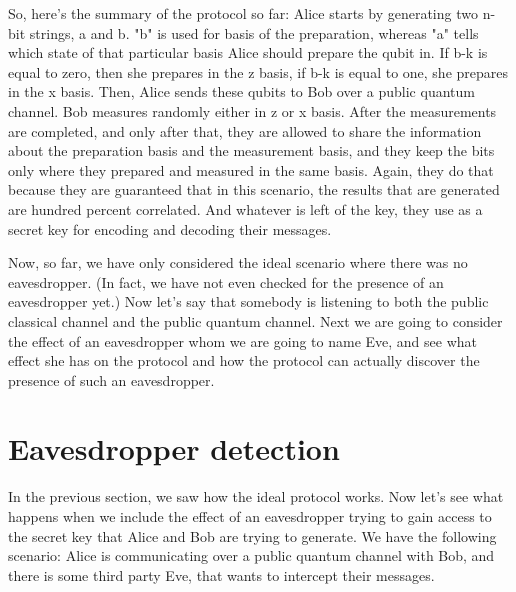 So, here's the summary of the protocol so far: Alice starts by generating two n-bit strings, a and b. "b" is used for basis of the preparation, whereas "a" tells which state of that particular basis Alice should prepare the qubit in. If b-k is equal to zero, then she prepares in the z basis, if b-k is equal to one, she prepares in the x basis. Then, Alice sends these qubits to Bob over a public quantum channel. Bob measures randomly either in z or x basis. After the measurements are completed, and only after that, they are allowed to share the information about the preparation basis and the measurement basis, and they keep the bits only where they prepared and measured in the same basis. Again, they do that because they are guaranteed that in this scenario, the results that are generated are hundred percent correlated. And whatever is left of the key, they use as a secret key for encoding and decoding their messages.

Now, so far, we have only considered the ideal scenario where there was no eavesdropper.  (In fact, we have not even checked for the presence of an eavesdropper yet.) Now let's say that somebody is listening to both the public classical channel and the public quantum channel. Next we are going to consider the effect of an eavesdropper whom we are going to name Eve, and see what effect she has on the protocol and how the protocol can actually discover the presence of such an eavesdropper.

\section{Eavesdropper detection}

In the previous section, we saw how the ideal protocol works. Now let's see what happens when we include the effect of an eavesdropper trying to gain access to the secret key that Alice and Bob are trying to generate.  We have the following scenario: Alice is communicating over a public quantum channel with Bob, and there is some third party Eve, that wants to intercept their messages.



